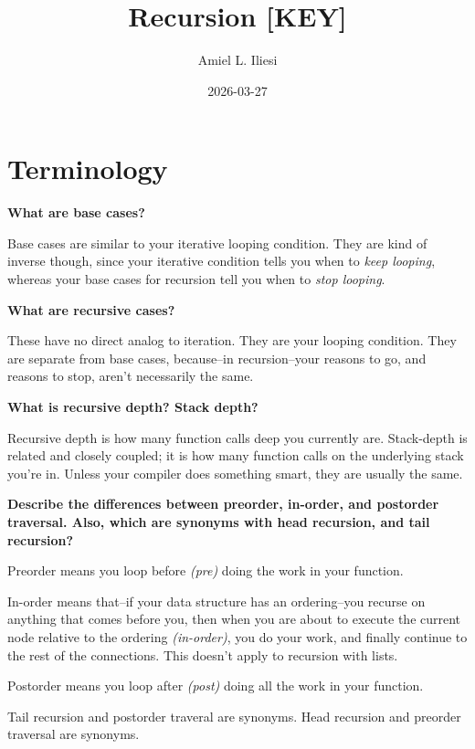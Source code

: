 \documentclass[12pt, letterpaper]{article}
\title{Recursion \color{red}\textbf{[KEY]}\normalcolor}
\author{Amiel L. Iliesi}
\date{2026-03-27}
\newcommand{\question}[1]{\textbf{#1}\par}
\newenvironment{answerblock}{\color{Green4}}{\normalcolor\vspace{1em}}
\begin{document}
\maketitle

\tableofcontents

\pagebreak
\section{Terminology}

\question{What are base cases?}
\begin{answerblock}
Base cases are similar to your iterative looping condition. They are kind of
inverse though, since your iterative condition tells you when to
\emph{keep looping}, whereas your base cases for recursion tell you when to
\emph{stop looping}.
\end{answerblock}

\question{What are recursive cases?}
\begin{answerblock}
These have no direct analog to iteration. They are your looping condition.
They are separate from base cases, because--in recursion--your reasons to go,
and reasons to stop, aren't necessarily the same.
\end{answerblock}

\question{What is recursive depth? Stack depth?}
\begin{answerblock}
Recursive depth is how many function calls deep you currently are. Stack-depth
is related and closely coupled; it is how many function calls on the underlying
stack you're in. Unless your compiler does something smart, they are usually
the same.
\end{answerblock}

\question{Describe the differences between preorder, in-order, and postorder
traversal. Also, which are synonyms with head recursion, and tail recursion?}

\begin{answerblock}
Preorder means you loop before \emph{(pre)} doing the work in your function.

In-order means that--if your data structure has an ordering--you recurse on
anything that comes before you, then when you are about to execute the current
node relative to the ordering \emph{(in-order)}, you do your work, and finally
continue to the rest of the connections. This doesn't apply to recursion with
lists.

Postorder means you loop after \emph{(post)} doing all the work in your
function.

Tail recursion and postorder traveral are synonyms. Head recursion and preorder
traversal are synonyms.
\end{answerblock}
\end{document}
